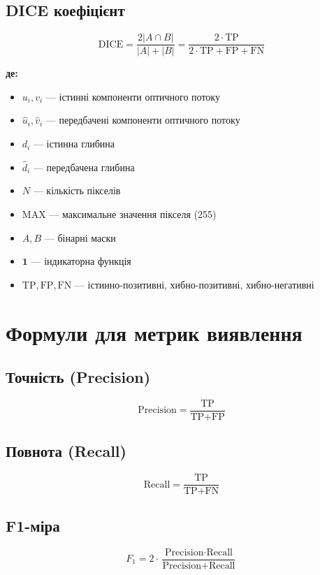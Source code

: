 \documentclass[14pt, a4paper]{extarticle}
\numberwithin{equation}{section}
\begin{document}
\subsection{DICE коефіцієнт}
\begin{equation}
\boxed{\text{DICE} = \frac{2|A \cap B|}{|A| + |B|} = \frac{2 \cdot \text{TP}}{2 \cdot \text{TP} + \text{FP} + \text{FN}}} \tag{70}
\end{equation}

\textbf{де:}
\begin{itemize}
\item $u_i, v_i$ — істинні компоненти оптичного потоку
\item $\hat{u}_i, \hat{v}_i$ — передбачені компоненти оптичного потоку
\item $d_i$ — істинна глибина
\item $\hat{d}_i$ — передбачена глибина
\item $N$ — кількість пікселів
\item $\text{MAX}$ — максимальне значення пікселя (255)
\item $A, B$ — бінарні маски
\item $\mathbf{1}$ — індикаторна функція
\item $\text{TP}, \text{FP}, \text{FN}$ — істинно-позитивні, хибно-позитивні, хибно-негативні
\end{itemize}

\newpage

\section{Формули для метрик виявлення}

\subsection{Точність (Precision)}
\begin{equation}
\boxed{\text{Precision} = \frac{\text{TP}}{\text{TP} + \text{FP}}} \tag{71}
\end{equation}

\subsection{Повнота (Recall)}
\begin{equation}
\boxed{\text{Recall} = \frac{\text{TP}}{\text{TP} + \text{FN}}} \tag{72}
\end{equation}

\subsection{F1-міра}
\begin{equation}
\boxed{F_1 = 2 \cdot \frac{\text{Precision} \cdot \text{Recall}}{\text{Precision} + \text{Recall}}} \tag{73}
\end{equation}
\end{document}
